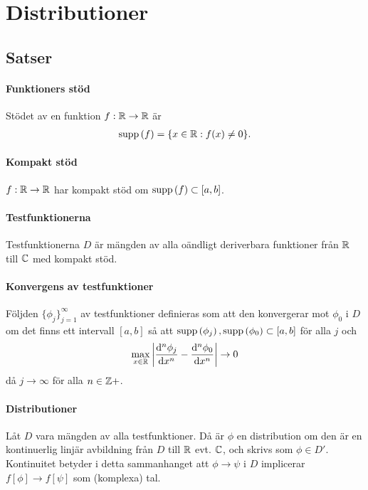 \section{Distributioner}

\subsection{Satser}

\paragraph{Funktioners stöd}
Stödet av en funktion $f: \mathbb{R}\to\mathbb{R}$ är
\begin{align*}
	\text{supp}\left(f\right) = \{x\in\mathbb{R}: f(x)\neq 0\}.
\end{align*}

\paragraph{Kompakt stöd}
$f: \mathbb{R}\to\mathbb{R}$ har kompakt stöd om $\text{supp}\left(f\right)\subset [a, b]$.

\paragraph{Testfunktionerna}
Testfunktionerna $D$ är mängden av alla oändligt deriverbara funktioner från $\mathbb{R}$ till $\mathbb{C}$ med kompakt stöd.

\paragraph{Konvergens av testfunktioner}
Följden $\{\phi_{j}\}_{j = 1}^{\infty}$ av testfunktioner definieras som att den konvergerar mot $\phi_{0}$ i $D$ om det finns ett intervall $[a, b]$ så att $\text{supp}\left(\phi_{j}\right), \text{supp}\left(\phi_{0}\right)\subset [a, b]$ för alla $j$ och
\begin{align*}
	\max\limits_{x\in\mathbb{R}}\abs{\dv[n]{\phi_{j}}{x} (x) - \dv[n]{\phi_{0}}{x} (x)}\to 0
\end{align*}
då $j\to\infty$ för alla $n\in\mathbb{Z}{+}$.

\paragraph{Distributioner}
Låt $D$ vara mängden av alla testfunktioner. Då är $\phi$ en distribution om den är en kontinuerlig linjär avbildning från $D$ till $\mathbb{R}$ evt. $\mathbb{C}$, och skrivs som $\phi\in D'$. Kontinuitet betyder i detta sammanhanget att $\phi\to\psi$ i $D$ implicerar $f[\phi]\to f[\psi]$ som (komplexa) tal.

